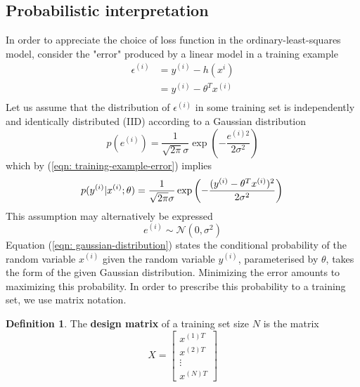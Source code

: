\documentclass{article}
\theoremstyle{definition}
\newtheorem{definition}{Definition}[section]
\theoremstyle{remark}
\begin{document}
\subsection{Probabilistic interpretation}
In order to appreciate the choice of loss function in the ordinary-least-squares model, consider the "error" produced by a linear model in a training example
\begin{align}
    \label{eqn: training-example-error}
    \epsilon^{(i)} &= y^{(i)} - h(x^{i}) \nonumber\\
                &= y^{(i)} - \theta^{T}x^{(i)} \\ \nonumber
\end{align}
Let us assume that the distribution of $\epsilon^{(i)}$ in some training set is independently and identically distributed (IID) according to a Gaussian distribution
\begin{equation}
    p(e^{(i)}) = \frac{1}{\sqrt{2\pi}\sigma}\exp\left(-\frac{e^{(i)2}}{2\sigma^{2}}\right)
\end{equation}
which by (\ref{eqn: training-example-error}) implies
\begin{equation}
    \label{eqn: gaussian-distribution}
    p(y^{(i)}|x^{(i)}; \theta) = \frac{1}{\sqrt{2\pi}\sigma}\exp\left(-\frac{(y^{(i)} - \theta^{T}x^{(i)})^{2}}{2\sigma^{2}}\right) \\
\end{equation}
This assumption may alternatively be expressed 
\begin{equation}
    e^{(i)} \sim \mathcal{N}(0, \sigma^{2})
\end{equation}
Equation (\ref{eqn: gaussian-distribution}) states the conditional probability of the random variable $x^{(i)}$ given the random variable $y^{(i)}$, parameterised by $\theta$, takes the form of the given Gaussian distribution.
Minimizing the error amounts to maximizing this probability.
In order to prescribe this probability to a training set, we use matrix notation.
\begin{definition}
    The \textbf{design matrix} of a training set size $N$ is the matrix 
    \begin{equation}
    X = 
    \begin{bmatrix}
        x^{(1)T} \\
        x^{(2)T} \\
        \vdots \\
        x^{(N)T}
    \end{bmatrix}
    \end{equation}
\end{definition}
\end{document}
